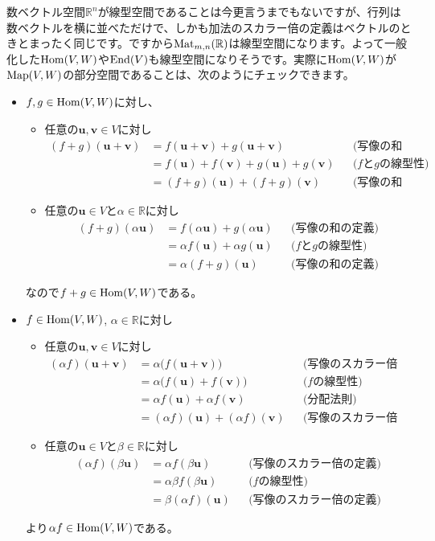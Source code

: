 数ベクトル空間$\mathbb{R}^n$が線型空間であることは今更言うまでもないですが、行列は数ベクトルを横に並べただけで、しかも加法のスカラー倍の定義はベクトルのときとまったく同じです。ですから$\operatorname{Mat}_{m, n}(\mathbb{R})$は線型空間になります。よって一般化した$\operatorname{Hom}(V, W)$や$\operatorname{End}(V)$も線型空間になりそうです。実際に$\operatorname{Hom}(V, W)$が$\operatorname{Map}(V, W)$の部分空間であることは、次のようにチェックできます。
\begin{itemize}
\item $f, g\in \operatorname{Hom}(V, W)$に対し、
\begin{itemize}
\item 任意の$\bm{u}, \bm{v}\in V$に対し
\begin{align*}
(f + g)(\bm{u} + \bm{v})
&= f(\bm{u} + \bm{v}) + g(\bm{u} + \bm{v}) & & \text{(写像の和の定義)} \\
&= f(\bm{u}) + f(\bm{v}) + g(\bm{u}) + g(\bm{v}) & & \text{($f$と$g$の線型性)} \\
&= (f + g)(\bm{u}) + (f + g)(\bm{v}) & & \text{(写像の和の定義)}
\end{align*}
\item 任意の$\bm{u} \in V$と$\alpha \in \mathbb{R}$に対し
\begin{align*}
(f + g)(\alpha \bm{u})
&= f(\alpha \bm{u}) + g(\alpha \bm{u}) & & \text{(写像の和の定義)} \\
&= \alpha f(\bm{u}) + \alpha g(\bm{u}) & & \text{($f$と$g$の線型性)} \\
&= \alpha(f + g)(\bm{u}) & & \text{(写像の和の定義)}
\end{align*}
\end{itemize}
なので$f+g \in \operatorname{Hom}(V, W)$である。
\item $f\in \operatorname{Hom}(V, W)$, $\alpha \in \mathbb{R}$に対し
\begin{itemize}
\item 任意の$\bm{u}, \bm{v}\in V$に対し
\begin{align*}
(\alpha f)(\bm{u} + \bm{v})
&= \alpha\bigl(f(\bm{u} + \bm{v})\bigr) & & \text{(写像のスカラー倍の定義)} \\
&= \alpha\bigl(f(\bm{u}) + f(\bm{v})\bigr) & & \text{($f$の線型性)} \\
&= \alpha f(\bm{u}) + \alpha f(\bm{v}) & & \text{(分配法則)} \\
&= (\alpha f)(\bm{u}) + (\alpha f)(\bm{v}) & & \text{(写像のスカラー倍の定義)}
\end{align*}
\item 任意の$\bm{u} \in V$と$\beta \in \mathbb{R}$に対し
\begin{align*}
(\alpha f)(\beta\bm{u})
&= \alpha f(\beta\bm{u}) & & \text{(写像のスカラー倍の定義)} \\
&= \alpha \beta f(\beta \bm{u}) & & \text{($f$の線型性)} \\
&= \beta(\alpha f)(\bm{u}) & & \text{(写像のスカラー倍の定義)}
\end{align*}
\end{itemize}
より$\alpha f\in \operatorname{Hom}(V, W)$である。
\end{itemize}

